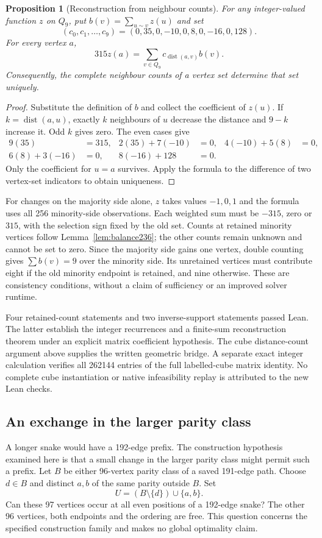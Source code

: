\documentclass[11pt,a4paper]{article}
\newtheorem{proposition}[theorem]{Proposition}
\theoremstyle{definition}
\theoremstyle{remark}
\newcommand{\Q}{Q}
\begin{document}
\begin{proposition}[Reconstruction from neighbour counts]
\label{prop:inverse236}
For any integer-valued function $z$ on $\Q_9$, put
$b(v)=\sum_{u\sim v}z(u)$ and set
\[
(c_0,c_1,\ldots,c_9)=(0,35,0,-10,0,8,0,-16,0,128).
\]
For every vertex $a$,
\[
 315z(a)=\sum_{v\in\Q_9}c_{\operatorname{dist}(a,v)}b(v).
\]
Consequently, the complete neighbour counts of a vertex set determine
that set uniquely.
\end{proposition}
\begin{proof}
Substitute the definition of $b$ and collect the coefficient of $z(u)$.
If $k=\operatorname{dist}(a,u)$, exactly $k$ neighbours of $u$ decrease
the distance and $9-k$ increase it. Odd $k$ gives zero. The even cases give
\[
\begin{aligned}
9(35)&=315, & 2(35)+7(-10)&=0, & 4(-10)+5(8)&=0,\\
6(8)+3(-16)&=0, & 8(-16)+128&=0.
\end{aligned}
\]
Only the coefficient for $u=a$ survives. Apply the formula to the
difference of two vertex-set indicators to obtain uniqueness.
\end{proof}

For changes on the majority side alone, $z$ takes values $-1,0,1$ and
the formula uses all 256 minority-side observations. Each weighted sum
must be $-315$, zero or $315$, with the selection sign fixed by the old
set. Counts at retained minority vertices follow
Lemma~\ref{lem:balance236}; the other counts remain unknown and cannot
be set to zero. Since the majority side gains one vertex, double counting
gives $\sum b(v)=9$ over the minority side. Its unretained vertices must
contribute eight if the old minority endpoint is retained, and nine
otherwise. These are consistency conditions, without a claim of
sufficiency or an improved solver runtime.

Four retained-count statements and two inverse-support statements passed
Lean. The latter establish the integer recurrences and a finite-sum
reconstruction theorem under an explicit matrix coefficient hypothesis.
The cube distance-count argument above supplies the written geometric
bridge. A separate exact integer calculation verifies all 262144 entries
of the full labelled-cube matrix identity. No complete cube instantiation
or native infeasibility replay is attributed to the new Lean checks.

\subsection{An exchange in the larger parity class}\label{sec:majority237}
A longer snake would have a 192-edge prefix. The construction hypothesis
examined here is that a small change in the larger parity class might
permit such a prefix. Let $B$ be either 96-vertex parity class of a saved
191-edge path. Choose $d\in B$ and distinct
$a,b$ of the same parity outside $B$. Set
\[
 U=(B\setminus\{d\})\cup\{a,b\}.
\]
Can these 97 vertices occur at all even positions of a 192-edge snake?
The other 96 vertices, both endpoints and the ordering are free. This
question concerns the specified construction family and makes no global
optimality claim.
\end{document}
